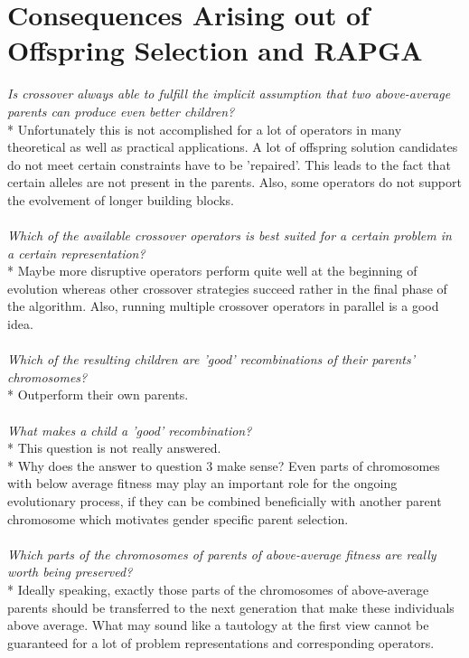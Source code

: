 \documentclass[12pt]{book}
\begin{document}
\section{Consequences Arising out of Offspring Selection and RAPGA}
\textit{Is crossover always able to fulfill the implicit assumption that two above-average parents can produce even better children?}\\*
Unfortunately this is not accomplished for a lot of operators in many theoretical as well as practical applications. A lot of offspring solution candidates do not meet certain constraints have to be 'repaired'. This leads to the fact that certain alleles are not present in the parents. Also, some operators do not support the evolvement of longer building blocks.\\\\
\textit{Which of the available crossover operators is best suited for a certain problem in a certain representation?}\\*
Maybe more disruptive operators perform quite well at the beginning of evolution whereas other crossover strategies succeed rather in the final phase of the algorithm. Also, running multiple crossover operators in parallel is a good idea.\\\\
\textit{Which of the resulting children are 'good' recombinations of their parents' chromosomes?}\\*
Outperform their own parents.\\\\
\textit{What makes a child a 'good' recombination?}\\*
This question is not really answered.\\*
Why does the answer to question 3 make sense? Even parts of chromosomes with below average fitness may play an important role for the ongoing evolutionary process, if they can be combined beneficially with another parent chromosome which motivates gender specific parent selection.\\\\
\textit{Which parts of the chromosomes of parents of above-average fitness are really worth being preserved?}\\*
Ideally speaking, exactly those parts of the chromosomes of above-average parents should be transferred to the next generation that make these individuals above average. What may sound like a tautology at the first view cannot be guaranteed for a lot of problem representations and corresponding operators.
\end{document}
